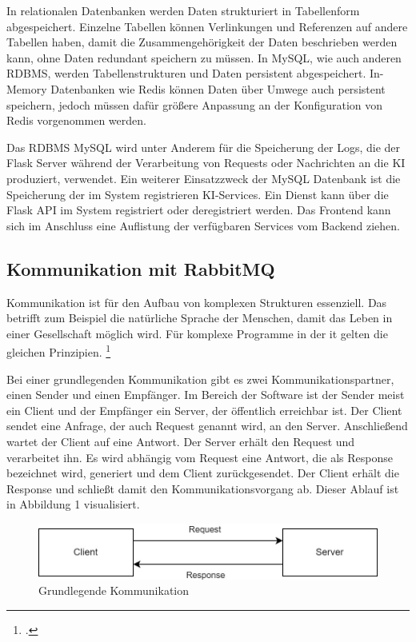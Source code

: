 In relationalen Datenbanken werden Daten strukturiert in Tabellenform abgespeichert. Einzelne Tabellen können Verlinkungen und Referenzen auf andere Tabellen haben, damit die Zusammengehörigkeit der Daten beschrieben werden kann, ohne Daten redundant speichern zu müssen. In MySQL, wie auch anderen RDBMS, werden Tabellenstrukturen und Daten persistent abgespeichert. In-Memory Datenbanken wie Redis können Daten über Umwege auch persistent speichern, jedoch müssen dafür größere Anpassung an der Konfiguration von Redis vorgenommen werden.

Das RDBMS MySQL wird unter Anderem für die Speicherung der Logs, die der Flask Server während der Verarbeitung von Requests oder Nachrichten an die KI produziert, verwendet. Ein weiterer Einsatzzweck der MySQL Datenbank ist die Speicherung der im System registrieren KI-Services. Ein Dienst kann über die Flask API im System registriert oder deregistriert werden. Das Frontend kann sich im Anschluss eine Auflistung der verfügbaren Services vom Backend ziehen.

\subsection{Kommunikation mit RabbitMQ}
Kommunikation ist für den Aufbau von komplexen Strukturen essenziell. Das betrifft zum Beispiel die natürliche Sprache der Menschen, damit das Leben in einer Gesellschaft möglich wird. Für komplexe Programme in der \ac{it} gelten die gleichen Prinzipien. \footcite{dossot2014rabbitmq}

Bei einer grundlegenden Kommunikation gibt es zwei Kommunikationspartner, einen Sender und einen Empfänger. Im Bereich der Software ist der Sender meist ein Client und der Empfänger ein Server, der öffentlich erreichbar ist. Der Client sendet eine Anfrage, der auch Request genannt wird, an den Server. Anschließend wartet der Client auf eine Antwort. Der Server erhält den Request und verarbeitet ihn. Es wird abhängig vom Request eine Antwort, die als Response bezeichnet wird, generiert und dem Client zurückgesendet. Der Client erhält die Response und schließt damit den Kommunikationsvorgang ab. Dieser Ablauf ist in Abbildung 1 visualisiert.
\begin{figure}[H]
  \centering
    \includegraphics[width = 15cm]{bilder/Rabbit1}
    \caption{Grundlegende Kommunikation}
\end{figure}

